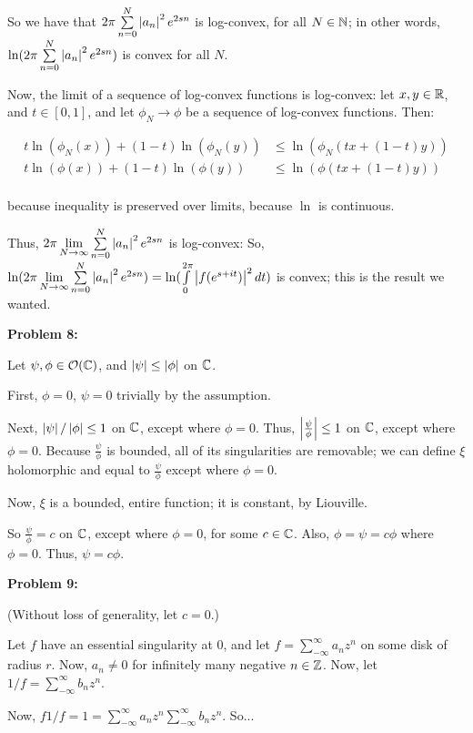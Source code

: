 \documentclass[a4paper,12pt]{article}
\begin{document}
So we have that $2\pi \sum\limits_{n=0}^N \left\lvert a_n \right\rvert^2 e^{2sn}$ is log-convex, for all $N \in \mathbb{N}$; in other words, $\ln(2\pi \sum\limits_{n=0}^N \left\lvert a_n \right\rvert^2 e^{2sn})$ is convex for all $N$.

Now, the limit of a sequence of log-convex functions is log-convex: let $x,y \in \mathbb{R}$, and $t \in [0,1]$, and let $\phi_N \to \phi$ be a sequence of log-convex functions. Then:

\begin{align*}
t\ln(\phi_N(x)) + (1-t)\ln(\phi_N(y)) &\leq \ln(\phi_N(tx+(1-t)y))\\
t\ln(\phi(x)) + (1-t)\ln(\phi(y)) &\leq \ln(\phi(tx+(1-t)y))\\
\end{align*}

because inequality is preserved over limits, because $\ln$ is continuous.

Thus, $2\pi \lim\limits_{N \to \infty}\sum\limits_{n=0}^N \left\lvert a_n \right\rvert^2 e^{2sn}$ is log-convex: So, $\ln(2\pi \lim\limits_{N \to \infty}\sum\limits_{n=0}^N \left\lvert a_n \right\rvert^2 e^{2sn}) = \ln(\int\limits_0^{2\pi} \left\lvert f(e^{s+it}) \right\rvert^2 dt)$ is convex; this is the result we wanted.

\shunt

{\bf Problem 8:}

Let $\psi, \phi \in \mathcal{O}(\mathbb{C})$, and $\left\lvert \psi \right\rvert \leq \left\lvert \phi \right\rvert$ on $\mathbb{C}$.

First, $\phi = 0$, $\psi = 0$ trivially by the assumption.

Next, $\left\lvert \psi \right\rvert/\left\lvert \phi \right\rvert \leq 1$ on $\mathbb{C}$, except where $\phi = 0$. Thus, $\left\lvert \frac{\psi}{\phi} \right\rvert \leq 1$ on $\mathbb{C}$, except where $\phi = 0$. Because $\frac{\psi}{\phi}$ is bounded, all of its singularities are removable; we can define $\xi$ holomorphic and equal to $\frac{\psi}{\phi}$ except where $\phi = 0$. 

Now, $\xi$ is a bounded, entire function; it is constant, by Liouville.

So $\frac{\psi}{\phi} = c$ on $\mathbb{C}$, except where $\phi = 0$, for some $c \in \mathbb{C}$. Also, $\phi = \psi = c\phi$ where $\phi = 0$. Thus, $\psi = c \phi$.

\shunt

{\bf Problem 9:}

(Without loss of generality, let $c=0$.)

Let $f$ have an essential singularity at $0$, and let $f= \sum\limits_{-\infty}^\infty a_n z^n$ on some disk of radius $r$. Now, $a_n \neq 0$ for infinitely many negative $n \in \mathbb{Z}$. Now, let $1/f = \sum\limits_{-\infty}^\infty b_n z^n$. 

Now, $f 1/f = 1 = \sum\limits_{-\infty}^\infty a_n z^n \sum\limits_{-\infty}^\infty b_n z^n$. So...%

\shunt
\end{document}
